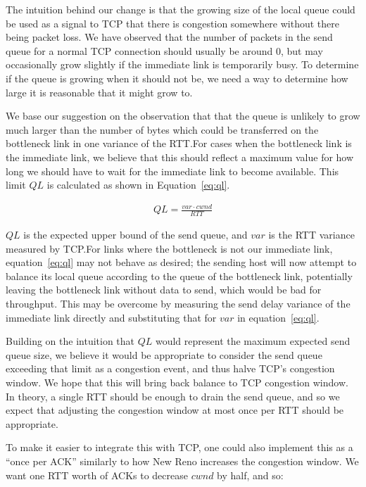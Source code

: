 The intuition behind our change is that the growing size of the local queue
could be used as a signal to TCP that there is congestion somewhere without
there being packet loss.
We have observed that the number of packets in the send queue for a normal
TCP connection should usually be around 0, but may occasionally grow slightly if
the immediate link is temporarily busy. To determine if the queue is growing
when it should not be, we need a way to determine how large it is reasonable
that it might grow to.

We base our suggestion on the observation that that the queue is unlikely to grow much
larger than the number of bytes which could be transferred on the bottleneck link
in one variance of the RTT.\@ For cases when the bottleneck link is the
immediate link, we believe that this should reflect a maximum value for how long we
should have to wait for the immediate link to become available. This limit $QL$ is
calculated as shown in Equation~\ref{eq:ql}.

\begin{align}
  QL = \frac{var \cdot cwnd}{RTT}\label{eq:ql}
\end{align}

$QL$ is the expected upper bound of the send queue, and $var$ is the RTT
variance measured by TCP.\@ For links where the bottleneck is not our immediate
link, equation~\ref{eq:ql} may not behave as desired; the sending
host will now attempt to balance its local queue according to the queue of the
bottleneck link, potentially leaving the bottleneck link without
data to send, which would be bad for throughput. This may be overcome by
measuring the send delay variance of the immediate link directly and
substituting that for $var$ in equation~\ref{eq:ql}.

Building on the intuition that $QL$ would represent the maximum expected send
queue size, we believe it would be appropriate to consider the send queue
exceeding that limit as a congestion event, and thus halve TCP's congestion
window. We hope that this will bring back balance to TCP congestion window.
In theory, a single RTT should be enough to drain the send queue, and so
we expect that adjusting the congestion window at most once per RTT should
be appropriate.

To make it easier to integrate this with TCP, one could also implement this as a
``once per ACK'' similarly to how New Reno increases the congestion
window. We want one RTT worth of ACKs to decrease $cwnd$ by half, and so:

